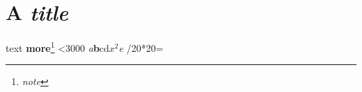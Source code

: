 \documentclass{article}
\begin{document}
\section{A \textit{title}} text \textbf{more}\footnote{\emph{note}}
\makeatletter
\newcount\n {}
\loop\ifnum\n<3000 {\itshape a}{\bfseries b}{\sffamily c}{\small d}{\footnotesize $x^2$}{\large\slshape e}\advance{} \ifnum\numexpr\n/20*20\relax=\n \par\fi\repeat
\end{document}
